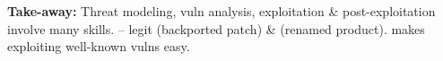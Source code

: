 \begin{defbox}
\textbf{Take-away:} Threat modeling, vuln analysis, exploitation \& post-exploitation involve many skills.  -- legit  (backported patch) \&  (renamed product).  makes exploiting well-known vulns easy.
\end{defbox}

